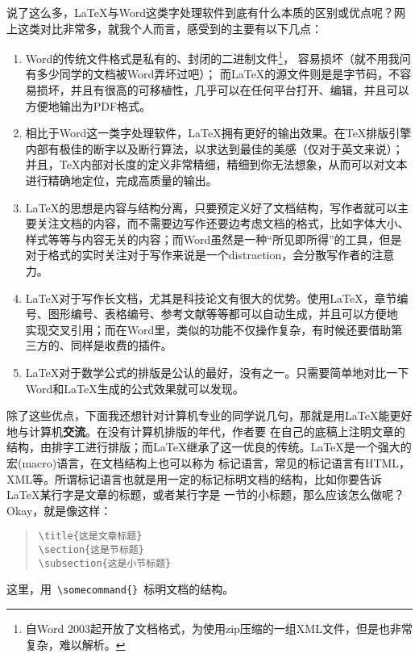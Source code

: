说了这么多，\LaTeX{}与Word这类字处理软件到底有什么本质的区别或优点呢？网上这类对比非常多，就我个人而言，感受到的主要有以下几点：
\begin{enumerate}

\item Word的传统文件格式是私有的、封闭的二进制文件\footnote{自Word 2003起开放了文档格式，为使用zip压缩的一组XML文件，但是也非常复杂，难以解析。}，
容易损坏（就不用我问有多少同学的文档被Word弄坏过吧）；
而\LaTeX{}的源文件则是是字节码，不容易损坏，并且有很高的可移植性，几乎可以在任何平台打开、编辑，并且可以方便地输出为PDF格式。

\item 相比于Word这一类字处理软件，\LaTeX{}拥有更好的输出效果。在\TeX{}排版引擎内部有极佳的断字以及断行算法，以求达到最佳的美感（仅对于英文来说）；
并且，\TeX{}内部对长度的定义非常精细，精细到你无法想象，从而可以对文本进行精确地定位，完成高质量的输出。

\item \LaTeX{}的思想是内容与结构分离，只要预定义好了文档结构，写作者就可以主要关注文档的内容，而不需要边写作还要边考虑文档的格式，比如字体大小、
样式等等与内容无关的内容；而Word虽然是一种“所见即所得”的工具，但是对于格式的实时关注对于写作来说是一个distraction，会分散写作者的注意力。

\item \LaTeX{}对于写作长文档，尤其是科技论文有很大的优势。使用\LaTeX{}，章节编号、图形编号、表格编号、参考文献等等都可以自动生成，并且可以方便地
实现交叉引用；而在Word里，类似的功能不仅操作复杂，有时候还要借助第三方的、同样是收费的插件。

\item \LaTeX{}对于数学公式的排版是公认的最好，没有之一。只需要简单地对比一下Word和\LaTeX{}生成的公式效果就可以发现。

\end{enumerate}

除了这些优点，下面我还想针对计算机专业的同学说几句，那就是用\LaTeX{}能更好地与计算机\textbf{交流}。在没有计算机排版的年代，作者要
在自己的底稿上注明文章的结构，由排字工进行排版；而\LaTeX{}继承了这一优良的传统。\LaTeX{}是一个强大的宏(macro)语言，在文档结构上也可以称为
标记语言，常见的标记语言有HTML，XML等。所谓标记语言也就是用一定的标记标明文档的结构，比如你要告诉\LaTeX{}某行字是文章的标题，或者某行字是
一节的小标题，那么应该怎么做呢？Okay，就是像这样：
\begin{quote}
\begin{verbatim}
\title{这是文章标题}
\section{这是节标题}
\subsection{这是小节标题}
\end{verbatim}
\end{quote}
这里，用~\verb+\somecommand{}+~标明文档的结构。

